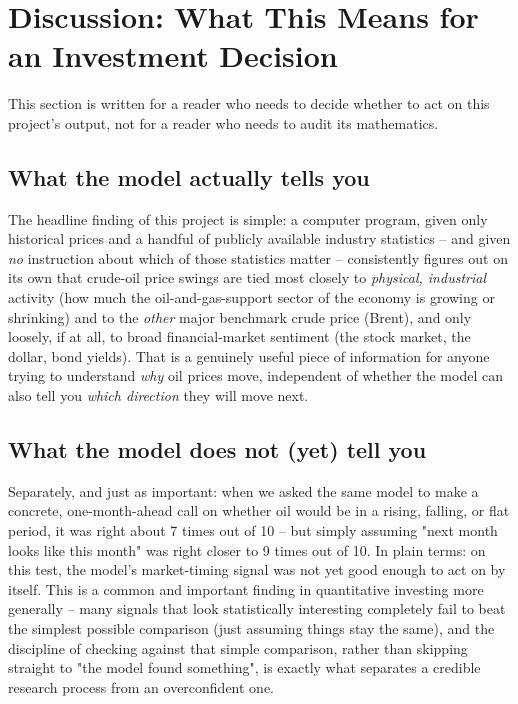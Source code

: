 \section{Discussion: What This Means for an Investment Decision}
\label{sec:discussion}

This section is written for a reader who needs to decide whether to act
on this project's output, not for a reader who needs to audit its
mathematics.

\subsection{What the model actually tells you}

The headline finding of this project is simple: a computer program,
given only historical prices and a handful of publicly available
industry statistics -- and given \emph{no} instruction about which of
those statistics matter -- consistently figures out on its own that
crude-oil price swings are tied most closely to \emph{physical,
industrial} activity (how much the oil-and-gas-support sector of the
economy is growing or shrinking) and to the \emph{other} major
benchmark crude price (Brent), and only loosely, if at all, to broad
financial-market sentiment (the stock market, the dollar, bond yields).
That is a genuinely useful piece of information for anyone trying to
understand \emph{why} oil prices move, independent of whether the model
can also tell you \emph{which direction} they will move next.

\subsection{What the model does not (yet) tell you}

Separately, and just as important: when we asked the same model to make
a concrete, one-month-ahead call on whether oil would be in a rising,
falling, or flat period, it was right about 7 times out of 10 -- but
simply assuming "next month looks like this month" was right closer to
9 times out of 10. In plain terms: on this test, the model's
market-timing signal was not yet good enough to act on by itself. This
is a common and important finding in quantitative investing more
generally -- many signals that look statistically interesting
completely fail to beat the simplest possible comparison (just assuming
things stay the same), and the discipline of checking against that
simple comparison, rather than skipping straight to "the model found
something", is exactly what separates a credible research process from
an overconfident one.

